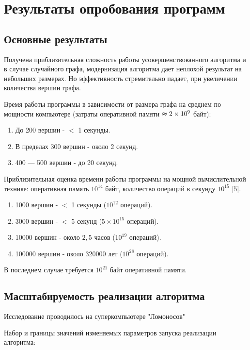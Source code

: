 \section{Результаты опробования программ}
\label{sec:Results_8} 
\large 

\subsection{Основные результаты}
Получена приблизительная сложность работы усовершенствованного алгоритма и в случае случайного графа, модернизация алгоритма дает неплохой результат на небольших размерах. Но эффективность стремительно падает, при увеличении количества вершин графа.

Время работы программы в зависимости от размера графа на среднем по мощности компьютере (затраты оперативной памяти $\thickapprox 2\times 10^9$ байт):
\begin{enumerate}
\item  До 200 вершин - $<$ 1 секунды.
\item  В пределах 300 вершин - около 2 секунд.
\item  400 — 500 вершин - до 20 секунд.
\end{enumerate}




Приблизительная оценка времени работы программы на мощной вычислительной технике:
оперативная память $10^{14}$ байт,
количество операций в секунду $10^{15}$ [5].
\begin{enumerate}
\item 1000 вершин - $<$ 1 секунды  ($10^{12}$  операций).
\item 3000 вершин - $<$ 5 секунд ($5\times 10^{15}$ операций).
\item 10000 вершин - около $2,5$ часов ($10^{19}$ операций).
\item 100000 вершин - около 320000 лет ($10 ^{28}$ операций).
\end{enumerate}
В последнем случае требуется $10^{21}$ байт оперативной памяти.


\subsection{Масштабируемость реализации алгоритма}
Исследование проводилось на суперкомпьютере "Ломоносов" \cite{Voevodin_article_1}

Набор и границы значений изменяемых параметров запуска реализации алгоритма: 


